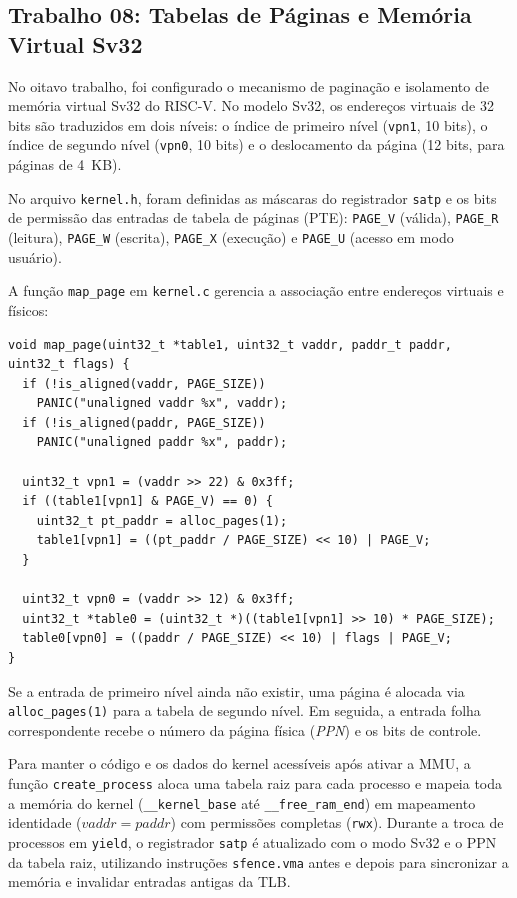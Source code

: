 \documentclass[12pt]{article}
\begin{document}
\subsection{Trabalho 08: Tabelas de Páginas e Memória Virtual Sv32}

No oitavo trabalho, foi configurado o mecanismo de paginação e isolamento de memória virtual Sv32 do RISC-V. No modelo Sv32, os endereços virtuais de 32 bits são traduzidos em dois níveis: o índice de primeiro nível (\texttt{vpn1}, 10 bits), o índice de segundo nível (\texttt{vpn0}, 10 bits) e o deslocamento da página (12 bits, para páginas de 4~KB).

No arquivo \texttt{kernel.h}, foram definidas as máscaras do registrador \texttt{satp} e os bits de permissão das entradas de tabela de páginas (PTE): \texttt{PAGE\_V} (válida), \texttt{PAGE\_R} (leitura), \texttt{PAGE\_W} (escrita), \texttt{PAGE\_X} (execução) e \texttt{PAGE\_U} (acesso em modo usuário).

A função \texttt{map\_page} em \texttt{kernel.c} gerencia a associação entre endereços virtuais e físicos:

\begin{verbatim}
void map_page(uint32_t *table1, uint32_t vaddr, paddr_t paddr, uint32_t flags) {
  if (!is_aligned(vaddr, PAGE_SIZE))
    PANIC("unaligned vaddr %x", vaddr);
  if (!is_aligned(paddr, PAGE_SIZE))
    PANIC("unaligned paddr %x", paddr);

  uint32_t vpn1 = (vaddr >> 22) & 0x3ff;
  if ((table1[vpn1] & PAGE_V) == 0) {
    uint32_t pt_paddr = alloc_pages(1);
    table1[vpn1] = ((pt_paddr / PAGE_SIZE) << 10) | PAGE_V;
  }

  uint32_t vpn0 = (vaddr >> 12) & 0x3ff;
  uint32_t *table0 = (uint32_t *)((table1[vpn1] >> 10) * PAGE_SIZE);
  table0[vpn0] = ((paddr / PAGE_SIZE) << 10) | flags | PAGE_V;
}
\end{verbatim}

Se a entrada de primeiro nível ainda não existir, uma página é alocada via \texttt{alloc\_pages(1)} para a tabela de segundo nível. Em seguida, a entrada folha correspondente recebe o número da página física (\textit{PPN}) e os bits de controle.

Para manter o código e os dados do kernel acessíveis após ativar a MMU, a função \texttt{create\_process} aloca uma tabela raiz para cada processo e mapeia toda a memória do kernel (\texttt{\_\_kernel\_base} até \texttt{\_\_free\_ram\_end}) em mapeamento identidade ($vaddr = paddr$) com permissões completas (\texttt{rwx}). Durante a troca de processos em \texttt{yield}, o registrador \texttt{satp} é atualizado com o modo Sv32 e o PPN da tabela raiz, utilizando instruções \texttt{sfence.vma} antes e depois para sincronizar a memória e invalidar entradas antigas da TLB.
\end{document}
